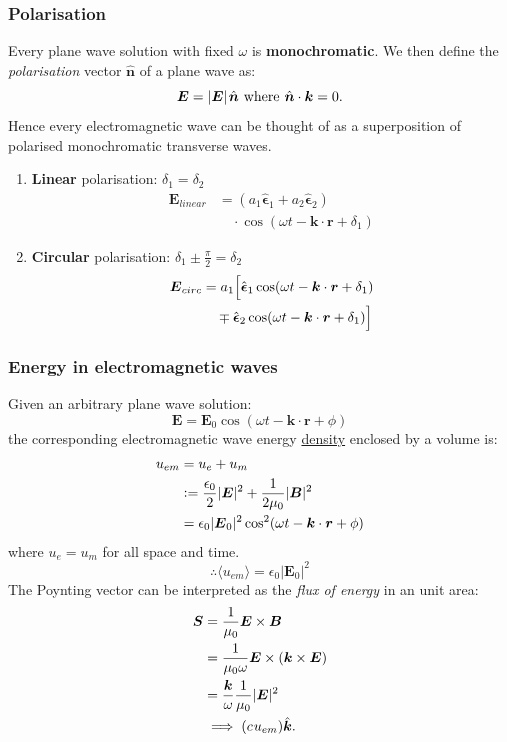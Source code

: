 \documentclass{article}
\newcommand{\deq}{\vcentcolon=}
\newcommand{\vc}[1]{\boldsymbol{#1}}
\begin{document}
\begin{multicols*}{3}
\subsubsection*{Polarisation}
Every plane wave solution with fixed $\omega$ is
\textbf{monochromatic}. We then define the \textit{polarisation}
vector $\hat{\vc{n}}$ of a plane wave as:
$$\vc{E}=|\vc{E}|\hspace{0.015in}\hat{\vc{n}}
\hspace{0.05in}\text{where}\hspace{0.05in}
\hat{\vc{n}}\cdot\vc{k}=0.$$
Hence every electromagnetic wave can be thought of
as a superposition of polarised monochromatic transverse waves.
\begin{enumerate}
    \item \textbf{Linear} polarisation: $\delta_1=\delta_2$
    \begin{align*}
        \vc{E}_{linear}
        &=(a_1\hat{\vc{\epsilon}}_1+a_2\hat{\vc{\epsilon}}_2) \\
        &\quad\cdot\cos(\omega t-\vc{k}\cdot\vc{r}+\delta_1)
    \end{align*}
    
    \item \textbf{Circular} polarisation:
    $\delta_1\pm\frac{\pi}{2}=\delta_2$
    \begin{align*}
        \vc{E}_{circ}
        &=a_1\Bigl[\hat{\vc{\epsilon}}_1\cos(\omega t
        -\vc{k}\cdot\vc{r}+\delta_1) \\
        &\quad\mp\hat{\vc{\epsilon}}_2\cos(\omega t
        -\vc{k}\cdot\vc{r}+\delta_1)\Bigr]
    \end{align*}
\end{enumerate}

\newcolumn

\subsubsection*{Energy in electromagnetic waves}
Given an arbitrary plane wave solution:
$$\vc{E}=\vc{E}_0\cos(\omega t-\vc{k}\cdot\vc{r}+\phi)$$
the corresponding electromagnetic wave energy
\underline{density} enclosed by a volume is:
\begin{align*}
    u_{em}
    &=u_e+u_m \\
    &\deq\frac{\epsilon_0}{2}|\vc{E}|^2
    +\frac{1}{2\mu_0}|\vc{B}|^2 \\
    &=\epsilon_0|\vc{E}_0|^2\cos^2(\omega t-\vc{k}\cdot\vc{r}+\phi)
\end{align*}
where $u_e=u_m$ for all space and time.
$$\therefore\langle u_{em}\rangle=\epsilon_0|\vc{E}_0|^2$$
The Poynting vector can be interpreted as the
\textit{flux of energy} in an unit area:
\begin{align*}
    \vc{S}
    &=\frac{1}{\mu_0}\vc{E}\times\vc{B} \\
    &=\frac{1}{\mu_0\omega}\vc{E}\times(\vc{k}\times\vc{E}) \\
    &=\frac{\vc{k}}{\omega}\frac{1}{\mu_0}|\vc{E}|^2 \\
    &\implies (c\hspace{0.01in}u_{em})\hat{\vc{k}}.
\end{align*}


\end{multicols*}
\end{document}
